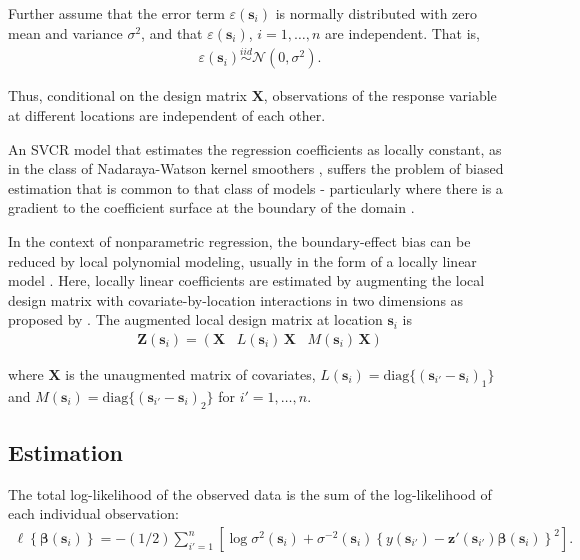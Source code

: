 \documentclass[authoryear, review, 11pt]{elsarticle}
\begin{document}
	Further assume that the error term $\varepsilon(\bm{s}_i)$ is normally distributed with zero mean and variance $\sigma^2$, and that $\varepsilon(\bm{s}_i)$, $i=1, \dots, n$ are independent. That is,
	\begin{align} \label{eq:err}
		\varepsilon(\bm{s}_i) \overset{iid}{\sim} \mathcal{N} \left( 0,\sigma^2 \right).
	\end{align}
	
  Thus, conditional on the design matrix $\bm{X}$, observations of the response variable at different locations are independent of each other.
  
  An SVCR model that estimates the regression coefficients as locally constant, as in the class of Nadaraya-Watson kernel smoothers \citep{Hardle-1990}, suffers the problem of biased estimation that is common to that class of models - particularly where there is a gradient to the coefficient surface at the boundary of the domain \citep{Hastie:1993b}.

  In the context of nonparametric regression, the boundary-effect bias can be reduced by local polynomial modeling, usually in the form of a locally linear model \citep{Fan-1996}. Here, locally linear coefficients are estimated by augmenting the local design matrix with covariate-by-location interactions in two dimensions as proposed by \cite{Wang:2008b}. The augmented local design matrix at location $\bm{s}_i$ is
  \begin{align}
    \bm{Z}(\bm{s}_i) = \left( \bm{X}  \;\;\; L(\bm{s}_i) \, \bm{X} \;\;\; M(\bm{s}_i) \, \bm{X} \right)
  \end{align} 
  
  where $\bm{X}$ is the unaugmented matrix of covariates, $L(\bm{s}_i) = \text{diag}\{ ( \bm{s}_{i'} - \bm{s}_{i} )_1 \}$ and $M(\bm{s}_i) = \text{diag}\{ ( \bm{s}_{i'} - \bm{s}_{i} )_2 \}$ for $i' = 1, \dots, n$.
  
  \subsection{Estimation}		
  The total log-likelihood of the observed data is the sum of the log-likelihood of each individual observation:
  \begin{align} \label{eq:coefficients}
  	\ell \left\{ \bm{\beta}(\bm{s}_i) \right\} = -(1/2) \sum_{i'=1}^n \left[ \log{\sigma^2(\bm{s}_i)}  + \sigma^{-2}(\bm{s}_i)  \left\{ y(\bm{s}_{i'}) - \bm{z}'(\bm{s}_{i'}) \bm{\beta}(\bm{s}_i) \right\}^2 \right].
  \end{align}
	
\end{document}
